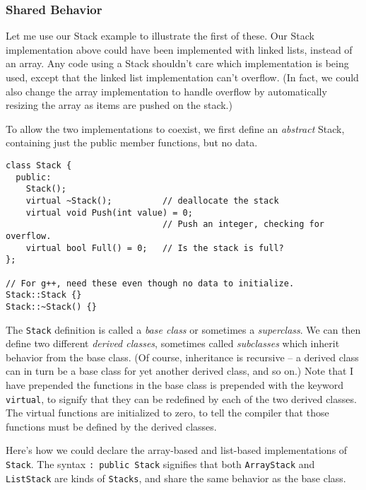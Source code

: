 \subsubsection{Shared Behavior}

Let me use our Stack example to illustrate the first of these.
Our Stack implementation
above could have been implemented with linked lists, instead of an array.
Any code using a Stack shouldn't
care which implementation is being used, except that the linked list
implementation can't overflow. (In fact, we could also change the
array implementation to handle overflow by automatically resizing
the array as items are pushed on the stack.)

To allow the two implementations to coexist, we first define an
{\em abstract} Stack, containing just the public member functions,
but no data.

\begin{verbatim}
class Stack {
  public:
    Stack();
    virtual ~Stack();          // deallocate the stack
    virtual void Push(int value) = 0;
                               // Push an integer, checking for overflow.
    virtual bool Full() = 0;   // Is the stack is full?
};

// For g++, need these even though no data to initialize.
Stack::Stack {}
Stack::~Stack() {}
\end{verbatim}

The {\tt Stack} definition is called a {\em base class} or sometimes a {\em
superclass}.  We can then define two different {\em derived classes},
sometimes called {\em subclasses} which inherit behavior from the base
class.  (Of course, inheritance is recursive -- a derived class can in
turn be a base class for yet another derived class, and so on.)
Note that I have prepended the functions in the base class is prepended
with the keyword {\tt virtual}, to signify that they can be redefined by
each of the two derived classes.  The virtual functions are
initialized to zero, to tell the compiler that those functions
must be defined by the derived classes.

Here's how we could declare the array-based and list-based
implementations of {\tt Stack}. The syntax {\tt : public Stack} signifies
that both {\tt ArrayStack} and {\tt ListStack} are kinds
of {\tt Stacks}, and share the same behavior as the base class.

